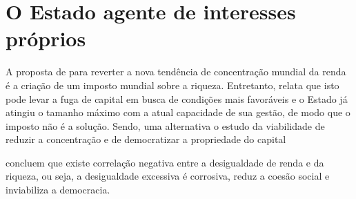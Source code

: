 \section{O Estado agente de interesses próprios}

A proposta de  para reverter a nova tendência de concentração mundial da renda é a criação de um imposto mundial sobre a riqueza.
Entretanto,  relata que isto pode levar a fuga de capital em busca de condições mais favoráveis e o Estado já atingiu o tamanho máximo com a atual capacidade de sua gestão, de modo que o imposto não é a solução.
Sendo, uma alternativa o estudo da viabilidade de reduzir a concentração e de democratizar a propriedade do capital

 concluem que existe correlação negativa entre a desigualdade de renda e da riqueza, ou seja, a desigualdade excessiva é corrosiva, reduz a coesão social e inviabiliza a democracia.
